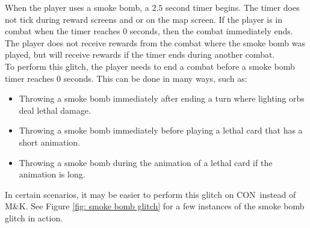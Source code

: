 \documentclass[12pt]{amsart}
\newcommand{\mk}{\textsf{M\&K}}
\newcommand{\con}{\textsf{CON}}
\begin{document}
When the player uses a smoke bomb, a $2.5$ second timer begins.  
The timer does not tick during reward screens and or on the map screen.  
If the player is in combat when the timer reaches $0$ seconds, then the combat immediately ends.  
The player does not receive rewards from the combat where the smoke bomb was played, but will receive rewards if the timer ends during another combat.  
\\

To perform this glitch, the player needs to end a combat before a smoke bomb timer reaches $0$ seconds.  
This can be done in many ways, such as: 
\begin{itemize}
    \item 
        Throwing a smoke bomb immediately after ending a turn where lighting orbs deal lethal damage.  
    \item 
        Throwing a smoke bomb immediately before playing a lethal card that has a short animation.  
    \item 
        Throwing a smoke bomb during the animation of a lethal card if the animation is long.  
\end{itemize}
In certain scenarios, it may be easier to perform this glitch on \con~instead of \mk.  
See Figure \ref{fig: smoke bomb glitch} for a few instances of the smoke bomb glitch in action.  
\end{document}
